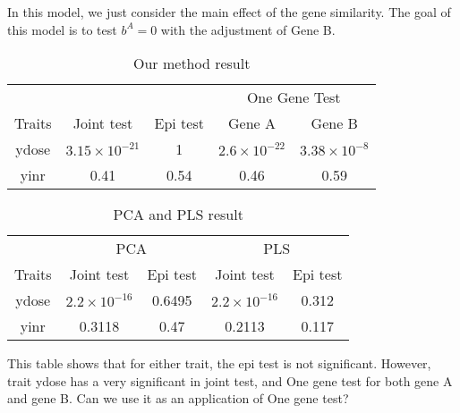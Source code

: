\documentclass{article}
\begin{document}
        In this model, we just consider the main effect of the gene similarity. The goal of this model is to test $b^A=0$ with the adjustment of Gene B.

        \begin{table}[htbp]
            \centering
            \caption{Our method result}
            \begin{tabular}{c|cccc}
                \toprule
                 & & & \multicolumn{2}{c}{One Gene Test}\\
                 \cmidrule{4-5}
                 Traits & Joint test & Epi test & Gene A & Gene B\\
                 \hline
                 ydose & $3.15\times10^{-21}$   &   1   &   $2.6\times 10^{-22}$    &   $3.38\times10^{-8}$\\
                 yinr  & 0.41                  &   0.54&   0.46                    &   0.59            \\
                \bottomrule
            \end{tabular}
        \end{table}
        
        
        \begin{table}[htbp]
            \centering
            \caption{PCA and PLS result}
            \begin{tabular}{c|cccc}
                \toprule
                 & \multicolumn{2}{c}{PCA}& \multicolumn{2}{c}{PLS}\\
                 \cmidrule{2-5}
                 Traits & Joint test & Epi test & Joint test & Epi test\\
                 \hline
                 ydose & $2.2\times10^{-16}$   &   0.6495   &   $2.2\times 10^{-16}$    &   0.312\\
                 yinr  & 0.3118                  &   0.47&   0.2113                   &   0.117            \\
                \bottomrule
            \end{tabular}
        \end{table}
        This table shows that for either trait, the epi test is not significant. However, trait ydose has a very significant in joint test, and One gene test for both gene A and gene B. Can we use it as an application of One gene test?
\end{document}
